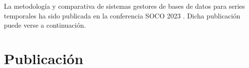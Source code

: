 
La metodología y comparativa de sistemas gestores de bases de datos para series temporales 
ha sido publicada en la conferencia SOCO 2023 \cite{8364SOCO}. Dicha publicación puede verse a continuación.

\section{Publicación}

